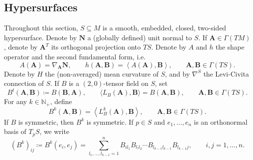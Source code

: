 \documentclass[11pt]{amsart}
\newcommand{\A}{\mathbf{A}}
\newcommand{\B}{\mathbf{B}}
\newcommand{\n}[1]{\nabla^\varepsilon_{ #1 }}
\renewcommand{\n}{\mathbf{N}}
\DeclareMathOperator{\trace}{trace}
\theoremstyle{definition}
\theoremstyle{remark}
\numberwithin{equation}{section}
\begin{document}
    \subsection{Hypersurfaces}
    Throughout this section, $S\subseteq M$ is a smooth, embedded, closed, two-sided hypersurface. Denote by $\n$ a (globally defined) unit normal to $S$. If $\A\in\Gamma(TM)$, denote by $\A^T$ its orthogonal projection onto $TS$. Denote by $A$ and $h$ the shape operator and the second fundamental form, i.e.
    \begin{equation*}
        A\left(\A\right)=\nabla_\A\n,\qquad h(\A,\B)=\left\langle A(\A),\B\right\rangle,\qquad\A,\B\in\Gamma(TS).    \end{equation*}
    Denote by $H$ the (non-averaged) mean curvature of $S$, and by $\nabla^S$ the Levi-Civita connection of $S$. If $B$ is a $(2,0)$-tensor field on $S$, set   \begin{equation*}
       B^t(\A,\B)\coloneqq B(\B,\A),\qquad \langle L_B(\A),\B\rangle=B(\A,\B),\qquad \A,\B\in\Gamma(TS).
    \end{equation*} 
    For any $k\in\mathbb N_+$, define 
\begin{equation*}
    B^k(\A,\B)=\left\langle L_B^k(\A),\B\right\rangle,\qquad \A,\B\in \Gamma(TS).
\end{equation*}
If $B$ is symmetric, then $B^k$ is symmetric. If $p\in S$ and $e_1,\ldots,e_n$ is an orthonormal basis of $T_p S$, we write
\begin{equation*}\label{atok}
   \left(B^k\right)_{ij}\coloneqq B^k(e_i,e_j)=\sum_{l_1,\ldots,l_{k-1}=1}^nB_{il_1}B_{l_!l_2}\cdots B_{l_{k-1}l_{k-1}}B_{l_{k-1}j},\qquad i,j=1,\ldots, n.
    \end{equation*}
\end{document}
